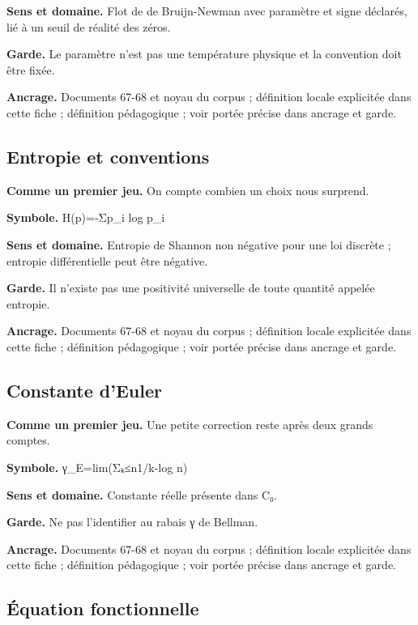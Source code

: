 \documentclass[
  9pt,
  a4paper,
]{article}
\begin{document}
\textbf{Sens et domaine.} Flot de de Bruijn-Newman avec paramètre et
signe déclarés, lié à un seuil de réalité des zéros.

\textbf{Garde.} Le paramètre n'est pas une température physique et la
convention doit être fixée.

\textbf{Ancrage.} Documents 67-68 et noyau du corpus ; définition locale
explicitée dans cette fiche ; définition pédagogique ; voir portée
précise dans ancrage et garde.

\hypertarget{entropie-et-conventions}{%
\subsection{Entropie et conventions}\label{entropie-et-conventions}}

\textbf{Comme un premier jeu.} On compte combien un choix nous surprend.

\textbf{Symbole.} H(p)=-Σp\_i log p\_i

\textbf{Sens et domaine.} Entropie de Shannon non négative pour une loi
discrète ; entropie différentielle peut être négative.

\textbf{Garde.} Il n'existe pas une positivité universelle de toute
quantité appelée entropie.

\textbf{Ancrage.} Documents 67-68 et noyau du corpus ; définition locale
explicitée dans cette fiche ; définition pédagogique ; voir portée
précise dans ancrage et garde.

\hypertarget{constante-deuler}{%
\subsection{Constante d'Euler}\label{constante-deuler}}

\textbf{Comme un premier jeu.} Une petite correction reste après deux
grands comptes.

\textbf{Symbole.} γ\_E=lim(Σₖ≤n1/k-log n)

\textbf{Sens et domaine.} Constante réelle présente dans C₀.

\textbf{Garde.} Ne pas l'identifier au rabais γ de Bellman.

\textbf{Ancrage.} Documents 67-68 et noyau du corpus ; définition locale
explicitée dans cette fiche ; définition pédagogique ; voir portée
précise dans ancrage et garde.

\hypertarget{uxe9quation-fonctionnelle}{%
\subsection{Équation fonctionnelle}\label{uxe9quation-fonctionnelle}}
\end{document}
